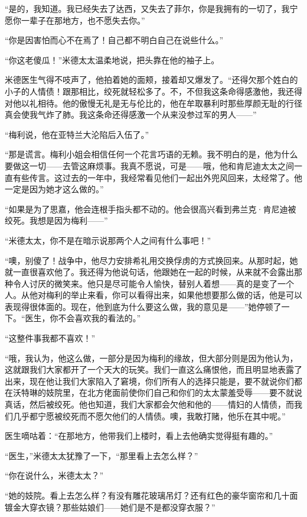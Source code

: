 \par “是的，我知道。我已经失去了达西，又失去了菲尔，你是我拥有的一切了，我宁愿你一辈子在那地方，也不愿失去你。”
\par “你是因害怕而心不在焉了！自己都不明白自己在说些什么。”
\par “你这老傻瓜！”米德太太温柔地说，把头靠在他的袖子上。
\par 米德医生气得不吱声了，他拍着她的面颊，接着却又爆发了。“还得欠那个姓白的小子的人情债！跟那相比，绞死就轻松多了。不，不但我这条命得感激他，我还得对他以礼相待。他的傲慢无礼是无与伦比的，他在牟取暴利时那些厚颜无耻的行径真会使我气炸了肺。我这条命还得感激一个从来没参过军的男人——”
\par “梅利说，他在亚特兰大沦陷后入伍了。”
\par “那是谎言。梅利小姐会相信任何一个花言巧语的无赖。我不明白的是，他为什么要做这一切——去管这麻烦事。我真不愿说，可是——哦，他和肯尼迪太太之间一直有些传言。这过去的一年中，我经常看见他们一起出外兜风回来，太经常了。他一定是因为她才这么做的。”
\par “如果是为了思嘉，他会连根手指头都不动的。他会很高兴看到弗兰克·肯尼迪被绞死。我想是因为梅利——”
\par “米德太太，你不是在暗示说那两个人之间有什么事吧！”
\par “噢，别傻了！战争中，他尽力安排希礼用交换俘虏的方式换回来。从那时起，她就一直很喜欢他了。我还得为他说句话，他跟她在一起的时候，从来就不会露出那种令人讨厌的微笑来。他只是尽可能令人愉快，替别人着想——真的是变了一个人。从他对梅利的举止来看，你可以看得出来，如果他想要那么做的话，他是可以表现得很体面的。现在，他到底为什么要这么做，我的意见是——”她停顿了一下。“医生，你不会喜欢我的看法的。”
\par “这整件事我都不喜欢！”
\par “哦，我认为，他这么做，一部分是因为梅利的缘故，但大部分则是因为他认为，这就跟我们大家都开了一个天大的玩笑。我们一直这么痛恨他，而且明显地表露了出来，现在他让我们大家陷入了窘境，你们所有人的选择只能是，要不就说你们都在沃特琳的妓院里，在北方佬面前使你们自己和你们的太太蒙羞受辱——要不就说真话，然后被绞死。他也知道，我们大家都会欠他和他的——情妇的人情债，而我们几乎都宁愿被绞死而不愿欠他们的人情债。噢，我敢打赌，他乐在其中呢。”
\par 医生嘀咕着：“在那地方，他带我们上楼时，看上去他确实觉得挺有趣的。”
\par “医生，”米德太太犹豫了一下，“那里看上去怎么样？”
\par “你在说什么，米德太太？”
\par “她的妓院。看上去怎么样？有没有雕花玻璃吊灯？还有红色的豪华窗帘和几十面镀金大穿衣镜？那些姑娘们——她们是不是都没穿衣服？”
